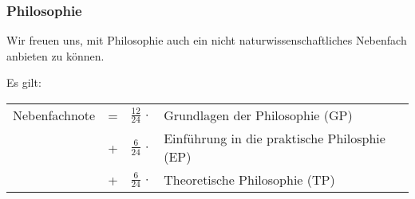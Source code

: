 \subsubsection{Philosophie}
Wir freuen uns, mit Philosophie auch ein nicht
naturwissenschaftliches Nebenfach anbieten zu können.

\begin{center}
\end{center}
Es gilt:\\[0.5ex]
\begin{tabular}{lcrl}
	Nebenfachnote & = &$\frac{12}{24}\,\cdot$&Grundlagen der Philosophie (GP)\\[0.5ex]
	& + &$\frac{6}{24}\,\cdot$&Einführung in die praktische Philosphie (EP)\\[0.5ex]
	& + &$\frac{6}{24}\,\cdot$&Theoretische Philosophie (TP)\\ 
\end{tabular}


